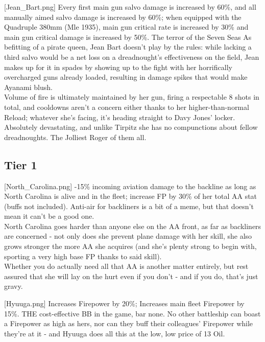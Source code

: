 [Jean_Bart.png]
{Every first main gun salvo damage is increased by 60\%, and all manually aimed salvo damage is increased by 60\%; when equipped with the Quadruple 380mm (Mle 1935), main gun critical rate is increased by 30\% and main gun critical damage is increased by 50\%.}
{The terror of the Seven Seas}
{As befitting of a pirate queen, Jean Bart doesn't play by the rules: while lacking a third salvo would be a net loss on a dreadnought's effectiveness on the field, Jean makes up for it in spades by showing up to the fight with her horrifically overcharged guns already loaded, resulting in damage spikes that would make Ayanami blush.\\
Volume of fire is ultimately maintained by her gun, firing a respectable 8 shots in total, and cooldowns aren't a concern either thanks to her higher-than-normal Reload; whatever she's facing, it's heading straight to Davy Jones' locker.\\
Absolutely devastating, and unlike Tirpitz she has no compunctions about fellow dreadnoughts. The Jolliest Roger of them all.}

 
\newpage
\subsection{Tier 1}
[North_Carolina.png]
{ -15\% incoming aviation damage to the backline as long as North Carolina is alive and in the fleet; increase FP by 30\% of her total AA stat (buffs not included).}
{}
{Anti-air for backliners is a bit of a meme, but that doesn't mean it can't be a good one.\\
North Carolina goes harder than anyone else on the AA front, as far as backliners are concerned - not only does she prevent plane damage with her skill, she also grows stronger the more AA she acquires (and she's plenty strong to begin with, sporting a very high base FP thanks to said skill).\\
Whether you do actually need all that AA is another matter entirely, but rest assured that she will lay on the hurt even if you don't - and if you do, that's just gravy.}

[Hyuuga.png]
{Increases Firepower by 20\%; Increases main fleet Firepower by 15\%.}
{}
{THE cost-effective BB in the game, bar none. No other battleship can boast a Firepower as high as hers, nor can they buff their colleagues' Firepower while they're at it - and Hyuuga does all this at the low, low price of 13 Oil.}

